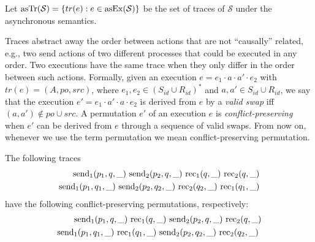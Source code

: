 
Let $\mathrm{asTr}({\mathcal{S}})={\{ tr(e):e\in \mathrm{asEx}({\mathcal{S}}) \}}$ be the set of traces of $\mathcal{S}$ under the asynchronous semantics.

Traces abstract away the order between actions that are not ``causally'' related, e.g., two send actions of two different processes that could be executed in any order. 
%
Two executions have the same trace when they only differ in the order between such actions.
Formally, given an execution $e=e_1\cdot a\cdot a'\cdot e_2$ with $tr(e)=(A,po,src)$, where $e_1, e_2\in (S_{id}\cup R_{id})^*$ and $a,a'\in S_{id}\cup R_{id}$, we say that the execution $e'=e_1\cdot a'\cdot a\cdot e_2$ is derived from $e$ by a \emph{valid swap} iff $(a,a')\not\in po\cup src$. A permutation $e'$ of an execution $e$ is \emph{conflict-preserving} when $e'$ can be derived from $e$ through a sequence of valid swaps. 
From now on, whenever we use the term permutation we mean conflict-preserving permutation.

\begin{example}\label{ex:perm}
The following traces 
\vspace{-2mm}
\begin{align*}
\send{1}{p_1,q,\_}\ 
\send{2}{p_2,q,\_}\ 
\rec{1}{q,\_}\ 
\rec{2}{q,\_} \\
\send{1}{p_1,q_1,\_}\ 
\send{2}{p_2,q_2,\_}\ 
\rec{2}{q_2,\_}\ 
\rec{1}{q_1,\_} 
\vspace{-4mm}
\end{align*}
have the following conflict-preserving permutations, respectively:
\vspace{-2mm}
\begin{align*}
\send{1}{p_1,q,\_}\ 
\rec{1}{q,\_}\ 
\send{2}{p_2,q,\_}\ 
\rec{2}{q,\_} \\
\send{1}{p_1,q_1,\_}\ 
\rec{1}{q_1,\_}\ 
\send{2}{p_2,q_2,\_}\ 
\rec{2}{q_2,\_}\ 
\vspace{-2mm}
\end{align*}
\end{example}

